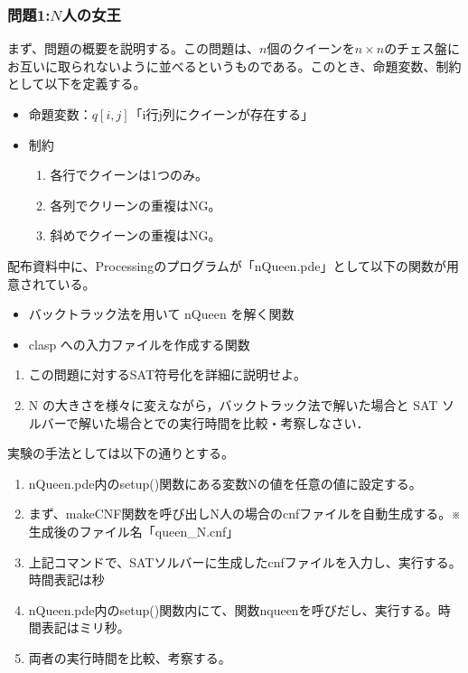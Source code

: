 \documentclass[dvipdfmx]{jsarticle}
\begin{document}
\subsubsection{問題1:$N$人の女王}
まず、問題の概要を説明する。この問題は、$n$個のクイーンを$n \times n$のチェス盤にお互いに取られないように並べるというものである。このとき、命題変数、制約として以下を定義する。
\begin{itemize}
  \item 命題変数：$q[i, j]$「i行j列にクイーンが存在する」
  \item 制約
  \begin{enumerate}
    \item 各行でクイーンは1つのみ。
    \item 各列でクリーンの重複はNG。
    \item 斜めでクイーンの重複はNG。
  \end{enumerate}
\end{itemize}
配布資料中に、Processingのプログラムが「nQueen.pde」として以下の関数が用意されている。
\begin{itemize}
  \item バックトラック法を用いて nQueen を解く関数
  \item clasp への入力ファイルを作成する関数
\end{itemize}
\begin{enumerate}
  \item この問題に対するSAT符号化を詳細に説明せよ。
  \item N の大きさを様々に変えながら，バックトラック法で解いた場合と SAT ソルバーで解いた場合とでの実行時間を比較・考察しなさい．
\end{enumerate}
実験の手法としては以下の通りとする。
\begin{enumerate}
  \item nQueen.pde内のsetup()関数にある変数Nの値を任意の値に設定する。
  \item まず、makeCNF関数を呼び出しN人の場合のcnfファイルを自動生成する。※生成後のファイル名「queen\_N.cnf」
  \item 上記コマンドで、SATソルバーに生成したcnfファイルを入力し、実行する。時間表記は秒
  \item nQueen.pde内のsetup()関数内にて、関数nqueenを呼びだし、実行する。時間表記はミリ秒。
  \item 両者の実行時間を比較、考察する。
\end{enumerate}
\end{document}
